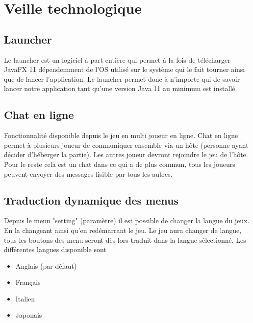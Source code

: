 \section{Veille technologique}
\subsection{Launcher}
Le launcher est un logiciel à part entière qui permet à la fois de télécharger JavaFX 11 dépendemment de l'OS utilisé sur le système qui le fait tourner ainsi que de lancer l'application. Le launcher permet donc à n'importe qui de savoir lancer 
notre application tant qu'une version Java 11 au minimum est installé.  
\subsection{Chat en ligne}
Fonctionnalité disponible depuis le jeu en multi joueur en ligne. Chat en ligne permet à plusieurs joueur de communiquer ensemble via un hôte (personne ayant décider d'héberger la partie). Les autres joueur devront rejoindre le jeu de l'hôte. 
Pour le reste cela est un chat dans ce qui a de plus commun, tous les joueurs peuvent envoyer des messages lisible par tous les autres. 
\subsection{Traduction dynamique des menus}
Depuis le menu "setting" (paramètre) il est possible de changer la langue du jeux. En la changeant ainsi qu'en redémarrant le jeu. Le jeu aura changer de langue, tous les boutons des menu seront dès lors traduit dans la langue sélectionné.
Les différentes langues disponible sont 
\begin{itemize}
	\item Anglais (par défaut)
	\item Français
	\item Italien
	\item Japonais
\end{itemize} 
